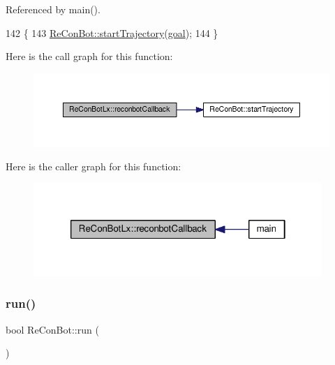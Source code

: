 Referenced by main().


\begin{DoxyCode}
142                                                                                  \{
143       \hyperlink{class_re_con_bot_ade3eb1a4752d45659321209f5730cef3}{ReConBot::startTrajectory}(\hyperlink{class_re_con_bot_a9bd1c7ddf2376e2e68ea5d8bd8c3f505}{goal});
144   \}
\end{DoxyCode}
Here is the call graph for this function\+:
\nopagebreak
\begin{figure}[H]
\begin{center}
\leavevmode
\includegraphics[width=350pt]{d2/d07/class_re_con_bot_lx_a5d60b16962e5ce8e452f7c53543c54ce_cgraph}
\end{center}
\end{figure}
Here is the caller graph for this function\+:
\nopagebreak
\begin{figure}[H]
\begin{center}
\leavevmode
\includegraphics[width=310pt]{d2/d07/class_re_con_bot_lx_a5d60b16962e5ce8e452f7c53543c54ce_icgraph}
\end{center}
\end{figure}
\mbox{\label{class_re_con_bot_ac264f3082203c3b2ef13b6f353476ca7}} 
\subsubsection{\texorpdfstring{run()}{run()}}
{\footnotesize\ttfamily bool Re\+Con\+Bot\+::run (\begin{DoxyParamCaption}{ }\end{DoxyParamCaption})\hspace{0.3cm}{\ttfamily [inherited]}}

